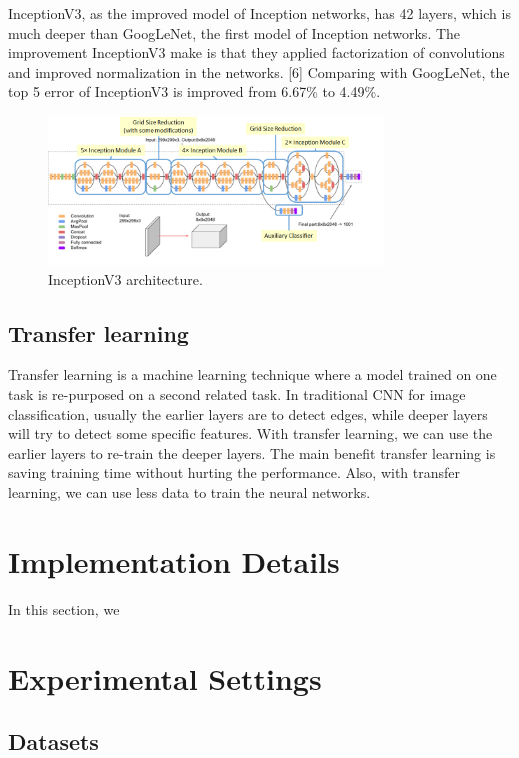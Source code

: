 \documentclass{article}
\begin{document}
InceptionV3, as the improved model of Inception networks, has 42 layers, which is much deeper than GoogLeNet, the first model of Inception networks. The improvement InceptionV3 make is that they applied factorization of convolutions and improved normalization in the networks. [6] Comparing with GoogLeNet, the top 5 error of InceptionV3 is improved from 6.67\% to 4.49\%.


\begin{figure}[H]
	\centering
	\includegraphics[width=3.5in]{pics/inception} 
	\caption{InceptionV3 architecture.}
\end{figure}

\subsection{Transfer learning}

Transfer learning is a machine learning technique where a model trained on one task is re-purposed on a second related task. In traditional CNN for image classification, usually the earlier layers are to detect edges, while deeper layers will try to detect some specific features. With transfer learning, we can use the earlier layers to re-train the deeper layers. The main benefit transfer learning is saving training time without hurting the performance. Also, with transfer learning, we can use less data to train the neural networks. 

\section{Implementation Details}

In this section, we 

\newpage
\section{Experimental Settings}

\subsection{Datasets}
\end{document}
